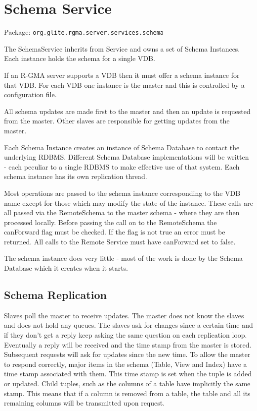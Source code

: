 \section{Schema Service}
\label{sec:schemaService}

Package: \texttt{org.glite.rgma.server.services.schema}

The SchemaService inherits from Service and owns a set of Schema
Instances. Each instance holds the schema for a single VDB. 

If an R-GMA server supports a VDB then it must offer a schema instance for that
VDB. For each VDB one instance is the master and this is controlled by a
configuration file.

All schema updates are made first to the master and then an update is requested
from the master. Other slaves are responsible for getting updates from
the master.

Each Schema Instance creates an instance of Schema Database to contact
the underlying RDBMS. Different Schema Database implementations will be
written - each peculiar to a single RDBMS to make effective use of
that system. Each schema instance has its own replication thread.

Most operations are passed to the schema instance corresponding to the
VDB name except for those which may modify the state of the
instance. These calls are all passed via the RemoteSchema to the
master schema - where they are then processed locally.  Before passing
the call on to the RemoteSchema the canForward flag must be
checked. If the flag is not true an error must be returned. All calls
to the Remote Service must have canForward set to false.

The schema instance does very little - most of the work is done by the
Schema Database which it creates when it starts.

\subsection{Schema Replication}
\label{sec:schemaReplication}
Slaves poll the master to receive updates. The master does not know
the slaves and does not hold any queues. The slaves ask for changes
since a certain time and if they don't get a reply keep asking the
same question on each replication loop. Eventually a reply will be
received and the time stamp from the master is stored. Subsequent
requests will ask for updates since the new time. To allow the master
to respond correctly, major items in the schema (Table, View and
Index) have a time stamp associated with them. This time stamp is set
when the tuple is added or updated. Child tuples, such as the columns
of a table have implicitly the same stamp. This means that if a column
is removed from a table, the table and all its remaining columns will
be transmitted upon request.


